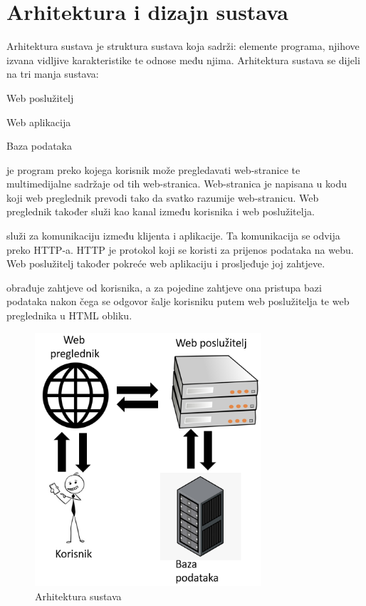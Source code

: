 
\chapter{Arhitektura i dizajn sustava}
		
		

		Arhitektura sustava je struktura sustava koja sadrži: elemente programa, njihove izvana vidljive karakteristike te odnose među njima.
		Arhitektura sustava se dijeli na tri manja sustava:
		\begin{packed_item}
			\item[$\bullet$] Web poslužitelj
			\item[$\bullet$] Web aplikacija
			\item[$\bullet$] Baza podataka
		\end{packed_item}
		
	
		
		 je program preko kojega korisnik može pregledavati web-stranice te multimedijalne sadržaje od tih web-stranica. Web-stranica je napisana u kodu koji web preglednik prevodi tako da svatko razumije web-stranicu. Web preglednik također služi kao kanal između korisnika i web poslužitelja.
		
		
		 služi za komunikaciju između klijenta i aplikacije. Ta komunikacija se odvija preko HTTP-a. HTTP je protokol koji se koristi za prijenos podataka na webu. Web poslužitelj također pokreće web aplikaciju i prosljeđuje joj zahtjeve.
		
		
		 obrađuje zahtjeve od korisnika, a za pojedine zahtjeve ona pristupa bazi podataka nakon čega se odgovor šalje korisniku putem web poslužitelja te web preglednika u HTML obliku.


		\begin{figure}[H]
			\centering
			\includegraphics[width=0.75\textwidth]{slike/arhitektura_sustava.PNG} 
			\caption{Arhitektura sustava}
			\label{fig:promjene1} 
		\end{figure}
		
